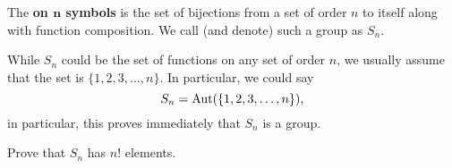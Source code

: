 \documentclass{ximera}
\begin{document}
\begin{definition}
  The  \textbf{on $\boldsymbol{n}$ symbols} is
  the set of bijections from a set of order $n$ to itself along with
  function composition. We call (and denote) such a group as $S_n$.
\end{definition}

\begin{remark}
  While $S_n$ could be the set of functions on any set of order $n$,
  we usually assume that the set is $\{1,2,3,\dots,n\}$. In
  particular, we could say
  \[
  S_n = \operatorname{Aut}(\{1,2,3,\dots,n\}),
  \]
  in particular, this proves immediately that $S_n$ is a group.
\end{remark}

\begin{exercise}
  Prove that $S_n$ has $n!$ elements.
\end{exercise}
\end{document}

